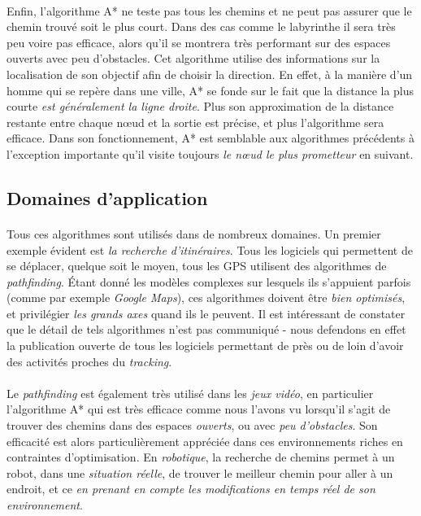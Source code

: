 \paragraph{} Enfin, l'algorithme A* ne teste pas tous les chemins et ne peut pas assurer que le chemin trouvé soit le
plus court. Dans des cas comme le labyrinthe il sera très peu voire pas efficace, alors qu'il se montrera très performant
sur des espaces ouverts avec peu d'obstacles. Cet algorithme utilise des informations sur la localisation de son
objectif afin de choisir la direction. En effet, à la manière d'un homme qui se repère dans une ville, A* se fonde sur le
fait que la distance la plus courte \emph{est généralement la ligne droite}. Plus son approximation de la distance 
restante entre chaque n\oe{}ud et la sortie est précise, et plus l'algorithme sera efficace. Dans son fonctionnement, A*
est semblable aux algorithmes précédents à l'exception importante qu'il visite toujours \emph{le n\oe{}ud le plus
prometteur} en suivant.

\subsection*{Domaines d'application}

\paragraph{} Tous ces algorithmes sont utilisés dans de nombreux domaines. Un premier exemple évident
est \emph{la recherche d'itinéraires}. Tous les logiciels qui permettent de se déplacer, quelque soit le moyen,
tous les GPS utilisent des algorithmes de \emph{pathfinding}. Étant donné les modèles complexes sur lesquels
ils s'appuient parfois (comme par exemple \emph{Google Maps}), ces algorithmes doivent être \emph{bien optimisés},
et privilégier \emph{les grands axes} quand ils le peuvent. Il est intéressant de constater que le détail de tels
algorithmes n'est pas communiqué - nous defendons en effet la publication ouverte de tous les logiciels permettant de près
ou de loin d'avoir des activités proches du \emph{tracking}.

\paragraph{} Le \emph{pathfinding} est également très utilisé dans les \emph{jeux vidéo}, en particulier l'algorithme A*
qui est très efficace comme nous l'avons vu lorsqu'il s'agit de trouver des chemins dans des espaces \emph{ouverts}, ou
avec \emph{peu d'obstacles}. Son efficacité est alors particulièrement appréciée dans ces environnements riches en contraintes 
d'optimisation. En \emph{robotique}, la recherche de chemins permet à un robot, dans une \emph{situation réelle}, de trouver
le meilleur chemin pour aller à un endroit, et ce \emph{en prenant en compte les modifications en temps réel de son environnement}.

